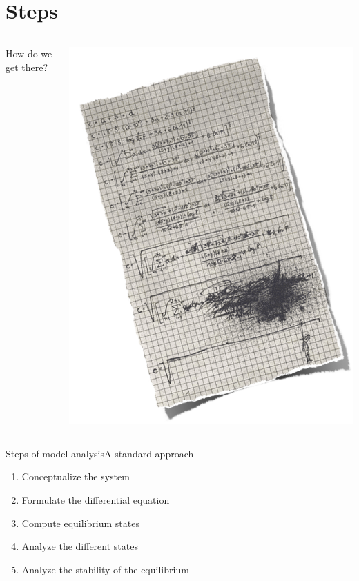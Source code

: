 \documentclass{eecslides}
\begin{document}

	\section{Steps}

		\begin{columns}
			\begin{column}{0.4\textwidth}			
				\huge{How do we get there?}
			\end{column}
			\begin{column}{0.6\textwidth}
				\begin{center}
					\includegraphics[height=0.9\textheight]{papier.png}
				\end{center}
			\end{column}
		\end{columns}	 

\begin{frame}{Steps of model analysis}{A standard approach}

	\begin{enumerate}
		\item Conceptualize the system
		\item Formulate the differential equation
		\item Compute equilibrium states
		\item Analyze the different states
		\item Analyze the stability of the equilibrium
	\end{enumerate}

\end{frame}
\end{document}
